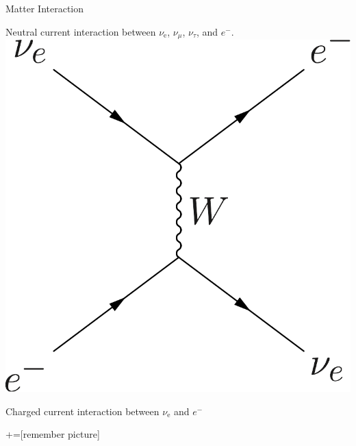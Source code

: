 \documentclass[9pt]{beamer}
\begin{document}
\begin{darkframes}
\begin{frame}{Matter Interaction}
\begin{tcolorbox}[sidebyside]
\color{black}Neutral current interaction between $\nu_{\mathrm e}$, $\nu_{\mu}$, $\nu_{\tau}$,
and $e^{-}$.
\tcblower
\centering
\includegraphics[height=0.32\textheight]{assets/charged-current.png}

\color{black}Charged current interaction between $\nu_{\mathrm e}$ and $e^{-}$
\end{tcolorbox}


\end{frame}





+=[remember picture]


\everymath{\displaystyle}








\end{darkframes}
\end{document}
